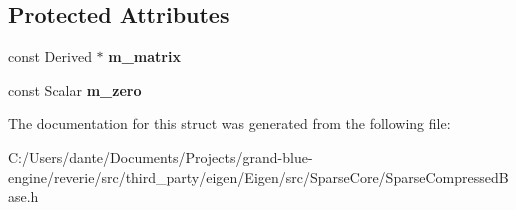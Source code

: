 \subsection*{Protected Attributes}
\begin{DoxyCompactItemize}
\item 
\mbox{\label{struct_eigen_1_1internal_1_1evaluator_3_01_sparse_compressed_base_3_01_derived_01_4_01_4_a7ade0dc31f165f3a986b6b071fb8bc58}} 
const Derived $\ast$ {\bfseries m\+\_\+matrix}
\item 
\mbox{\label{struct_eigen_1_1internal_1_1evaluator_3_01_sparse_compressed_base_3_01_derived_01_4_01_4_aae5203679f27d57f812976ee83afc227}} 
const Scalar {\bfseries m\+\_\+zero}
\end{DoxyCompactItemize}


The documentation for this struct was generated from the following file\+:\begin{DoxyCompactItemize}
\item 
C\+:/\+Users/dante/\+Documents/\+Projects/grand-\/blue-\/engine/reverie/src/third\+\_\+party/eigen/\+Eigen/src/\+Sparse\+Core/Sparse\+Compressed\+Base.\+h\end{DoxyCompactItemize}
